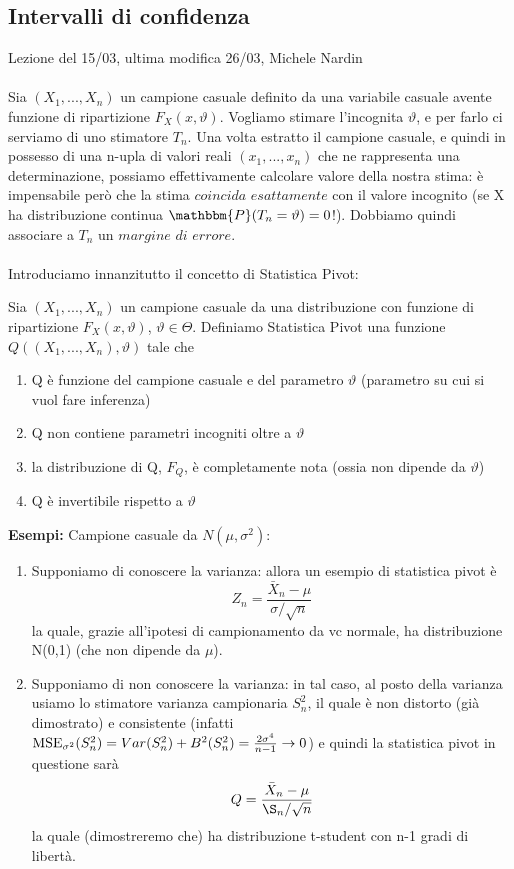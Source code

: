 
\subsection{Intervalli di confidenza}
Lezione del 15/03, ultima modifica 26/03, Michele Nardin
\\ \\
Sia $(X_1,...,X_n)$ un campione casuale definito da una variabile casuale avente funzione di ripartizione $F_X(x,\vartheta)$. Vogliamo stimare l'incognita $\vartheta$, e per farlo ci serviamo di uno stimatore $T_n$.
Una volta estratto il campione casuale, e quindi in possesso di una n-upla di valori reali $(x_1,...,x_n)$ che ne rappresenta una determinazione, possiamo effettivamente calcolare valore della nostra stima: è impensabile però che la stima $coincida$ $esattamente$ con il valore incognito (se X ha distribuzione continua $\mathbbm{P}(T_n=\vartheta)=0$!). Dobbiamo quindi associare a $T_n$ un $margine$ $di$ $errore$.
\\ \\
Introduciamo innanzitutto il concetto di Statistica Pivot:
\begin{definizione}
Sia $(X_1,...,X_n)$ un campione casuale da una distribuzione con funzione di ripartizione $F_X (x,\vartheta)$, $\vartheta \in \Theta$. 
Definiamo Statistica Pivot una funzione $Q((X_1,...,X_n),\vartheta)$ tale che
\begin{enumerate}
\item Q è funzione del campione casuale e del parametro $\vartheta$ (parametro su cui si vuol fare inferenza)
\item Q non contiene parametri incogniti oltre a $\vartheta$
\item la distribuzione di Q, $F_Q$, è completamente nota (ossia non dipende da $\vartheta$)
\item Q è invertibile rispetto a $\vartheta$
\end{enumerate}
\end{definizione}

\noindent\textbf{Esempi:}
Campione casuale da $N(\mu,\sigma^2)$:
\begin{enumerate}
\item Supponiamo di conoscere la varianza: allora un esempio di statistica pivot è $$Z_n=\frac{\bar{X}_n - \mu}{\sigma / \sqrt{n}} $$ la quale, grazie all'ipotesi di campionamento da vc normale, ha distribuzione N(0,1) (che non dipende da $\mu$).
\item Supponiamo di non conoscere la varianza: in tal caso, al posto della varianza usiamo lo stimatore varianza campionaria $S_n^2$, il quale è non distorto (già dimostrato) e consistente (infatti $\operatorname{MSE}_{\sigma^2}(S_n^2)=Var(S_n^2) + B^2(S_n^2)=\frac{2\sigma^4}{n-1} \rightarrow 0$) e quindi la statistica pivot in questione sarà $$Q=\frac{\bar{X}_n - \mu}{\S_n / \sqrt{n}}$$ la quale (dimostreremo che) ha distribuzione t-student con n-1 gradi di libertà.
\end{enumerate}


